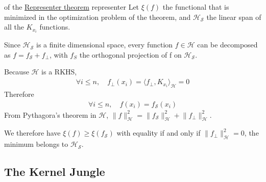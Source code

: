 \documentclass[10pt]{article}
\begin{document}
\begin{Proof}{of the \hyperref[thm:representer]{Representer theorem}}
  {representer}
  Let $\xi(f)$ the functional that is minimized in the optimization problem of 
  the  theorem, and $\mathcal{H}_\mathcal{S}$ the linear span of all the 
  $K_{x_i}$ functions. 
  
  Since $\mathcal{H}_\mathcal{S}$ is a finite dimensional space, every function 
  $f\in\mathcal{H}$ can be decomposed as $f = f_\mathcal{S} + f_\perp$, with 
  $f_S$ the orthogonal projection of f on $\mathcal{H}_\mathcal{S}$.

  Because $\mathcal{H}$ is a RKHS, 
  \begin{align*}
    \forall i \leq n,\quad f_\perp(x_i) = \langle f_\perp, K_{x_i} 
    \rangle_\mathcal{H} = 0
  \end{align*}
  Therefore 
  \begin{align*}
    \forall  i \leq n,\quad f(x_i) = f_\mathcal{S}(x_i)
  \end{align*}
  From Pythagora's theorem in $\mathcal{H}$, $\lVert f\rVert^2_\mathcal{H} = 
  \lVert f_\mathcal{S}\rVert^2_\mathcal{H} + \lVert f_\perp
  \rVert^2_\mathcal{H}$.

  We therefore have $\xi(f) \geq \xi(f_\mathcal{S})$ with equality if and only
  if $\lVert f_\perp\rVert^2_\mathcal{H} = 0$, the minimum belongs to 
  $\mathcal{H}_\mathcal{S}$.
\end{Proof}

\subsection{The Kernel Jungle}

\begin{Proof}{}{}
  
\end{Proof}
\end{document}
